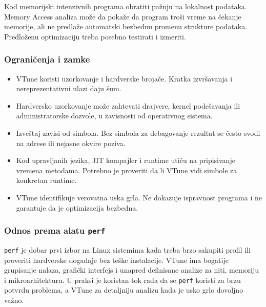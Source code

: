 Kod memorijski intenzivnih programa obratiti pažnju na lokalnost podataka. Memory Access analiza može da pokaže da program troši vreme na čekanje memorije, ali ne predlaže automatski bezbednu promenu strukture podataka. Predloženu optimizaciju treba posebno testirati i izmeriti.

\subsubsection{Ograničenja i zamke}\label{vtune-ogranicenja}

\begin{itemize}
\tightlist
\item
  VTune koristi uzorkovanje i hardverske brojače. Kratka izvršavanja i nereprezentativni ulazi daju šum.
\item
  Hardversko uzorkovanje može zahtevati drajvere, kernel podešavanja ili administratorske dozvole, u zavisnosti od operativnog sistema.
\item
  Izveštaj zavisi od simbola. Bez simbola za debagovanje rezultat se često svodi na adrese ili nejasne okvire poziva.
\item
  Kod upravljanih jezika, JIT kompajler i runtime utiču na pripisivanje vremena metodama. Potrebno je proveriti da li VTune vidi simbole za konkretan runtime.
\item
  VTune identifikuje verovatna uska grla. Ne dokazuje ispravnost programa i ne garantuje da je optimizacija bezbedna.
\end{itemize}

\subsubsection{Odnos prema alatu \texttt{perf}}\label{vtune-perf}

\texttt{perf} je dobar prvi izbor na Linux sistemima kada treba brzo sakupiti profil ili proveriti hardverske događaje bez teške instalacije. VTune ima bogatije grupisanje nalaza, grafički interfejs i unapred definisane analize za niti, memoriju i mikroarhitekturu. U praksi je koristan tok rada da se \texttt{perf} koristi za brzu potvrdu problema, a VTune za detaljniju analizu kada je usko grlo dovoljno važno.

